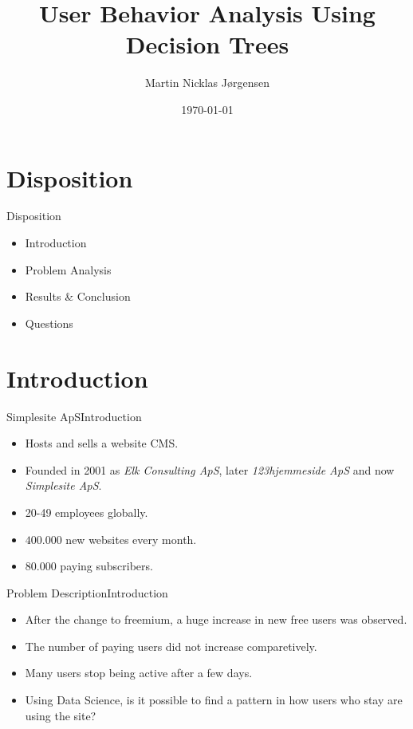 \documentclass[12pt,aspectratio=1610]{beamer}
\title[Company Project]{User Behavior Analysis Using Decision Trees}
\author{Martin Nicklas Jørgensen}
\institute{Department of Computer Science}
\date{\today}
\begin{document}
\frame[plain]{\titlepage}

\section{Disposition}
\begin{frame}{Disposition}
	\begin{itemize}
		\item Introduction 
		\item Problem Analysis
		\item Results \& Conclusion
		\item Questions
	\end{itemize}
\end{frame}

\section{Introduction}

\begin{frame}{Simplesite ApS}{Introduction}
	\begin{itemize}
		\item Hosts and sells a website CMS.
		\item Founded in 2001 as \textit{Elk Consulting ApS}, later \textit{123hjemmeside ApS} and now \textit{Simplesite ApS}.
		\item 20-49 employees globally.
		\item $400.000$ new websites every month.
		\item $80.000$ paying subscribers.
	\end{itemize}
\end{frame}

\begin{frame}{Problem Description}{Introduction}
	\begin{itemize}
		\item After the change to freemium, a huge increase in new free users was observed.
		\item The number of paying users did not increase comparetively.
		\item Many users stop being active after a few days.
		\item Using Data Science, is it possible to find a pattern in how users who stay are using the site?
	\end{itemize}
\end{frame}
\end{document}

